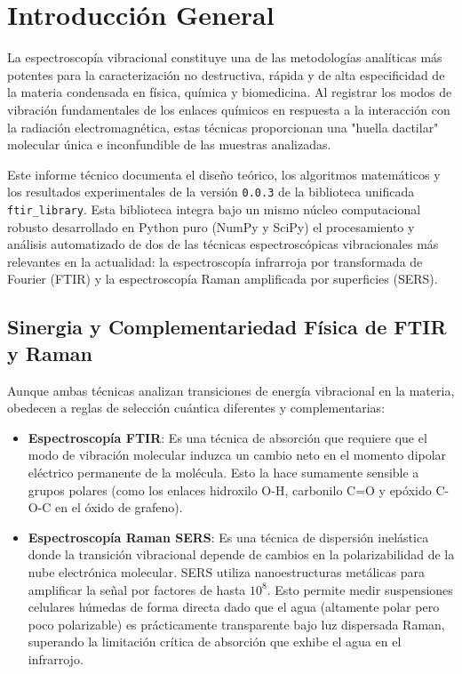 \section{Introducción General}
La espectroscopía vibracional constituye una de las metodologías analíticas más potentes para la caracterización no destructiva, rápida y de alta especificidad de la materia condensada en física, química y biomedicina. Al registrar los modos de vibración fundamentales de los enlaces químicos en respuesta a la interacción con la radiación electromagnética, estas técnicas proporcionan una "huella dactilar" molecular única e inconfundible de las muestras analizadas.

Este informe técnico documenta el diseño teórico, los algoritmos matemáticos y los resultados experimentales de la versión \texttt{0.0.3} de la biblioteca unificada \texttt{ftir\_library}. Esta biblioteca integra bajo un mismo núcleo computacional robusto desarrollado en Python puro (NumPy y SciPy) el procesamiento y análisis automatizado de dos de las técnicas espectroscópicas vibracionales más relevantes en la actualidad: la espectroscopía infrarroja por transformada de Fourier (FTIR) y la espectroscopía Raman amplificada por superficies (SERS).

\subsection{Sinergia y Complementariedad Física de FTIR y Raman}
Aunque ambas técnicas analizan transiciones de energía vibracional en la materia, obedecen a reglas de selección cuántica diferentes y complementarias:
\begin{itemize}
    \item \textbf{Espectroscopía FTIR}: Es una técnica de absorción que requiere que el modo de vibración molecular induzca un cambio neto en el momento dipolar eléctrico permanente de la molécula. Esto la hace sumamente sensible a grupos polares (como los enlaces hidroxilo O-H, carbonilo C=O y epóxido C-O-C en el óxido de grafeno).
    \item \textbf{Espectroscopía Raman SERS}: Es una técnica de dispersión inelástica donde la transición vibracional depende de cambios en la polarizabilidad de la nube electrónica molecular. SERS utiliza nanoestructuras metálicas para amplificar la señal por factores de hasta $10^8$. Esto permite medir suspensiones celulares húmedas de forma directa dado que el agua (altamente polar pero poco polarizable) es prácticamente transparente bajo luz dispersada Raman, superando la limitación crítica de absorción que exhibe el agua en el infrarrojo.
\end{itemize}

